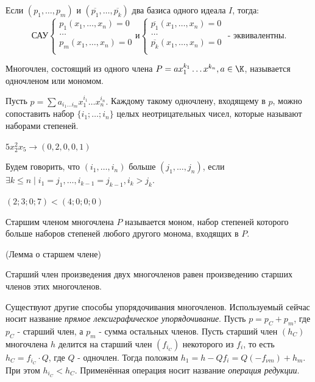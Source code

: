 \utv Если $(p_1,\ldots,p_m)$ и $(\overline{p_1},\ldots,\overline{p_k})$ два базиса одного идеала $I$, тогда:
\begin{equation*}
	\text{САУ}
	\begin{cases}
	   	p_1(x_1,\ldots,x_n) = 0\\
		\ldots\\
	   	p_m(x_1,\ldots,x_n) = 0\\
	\end{cases}
\text{и}
	\begin{cases}
	   	\overline{p_1}(x_1,\ldots,x_n) = 0\\
		\ldots\\
	   	\overline{p_k}(x_1,\ldots,x_n) = 0\\
	\end{cases}
\text{ - эквивалентны.}
\end{equation*}

\opr Многочлен, состоящий из одного члена $P = ax_1^{k_1}\ldots x^{k_n}, a \in \K$, называется одночленом или мономом.

Пусть $p = \sum a_{i_1 \ldots i_m}x_1^{i_1}\ldots x_n^{i_n}.$ Каждому такому одночлену, входящему в $p$, можно сопоставить набор $\{i_1;\ldots;i_n\}$  целых неотрицательных чисел, которые называют наборами степеней.

\example $5x_2^2x_5 \rightarrow (0,2,0,0,1)$

\opr Будем говорить, что $(i_1,\ldots,i_n)$ больше $(j_1,\ldots,j_n)$, если $\exists k \le n \mid i_1 = j_1, \ldots, i_{k-1} = j_{k-1},i_k > j_k$.

\example $(2;3;0;7) < (4;0;0;0)$

\opr Старшим членом многочлена $P$ называется моном, набор степеней которого больше наборов степеней любого другого монома, входящих в $P$.

\lem (Лемма о старшем члене)

Старший член произведения двух многочленов равен произведению старших членов этих многочленов.

\note Существуют другие способы упорядочивания многочленов. Используемый сейчас носит название \textit{прямое лексиграфическое упорядочивание}. Пусть $p = p_C + p_m$, где $p_C$ - старший член, а $p_m$ - сумма остальных членов. Пусть старший член $(h_C)$ многочлена $h$ делится на старший член $(f_{i_C})$ некоторого из $f_i$, то есть $h_C = f_{i_C} \cdot Q$, где $Q$ - одночлен. Тогда положим $h_1 = h - Qf_i = Q(-f_{\nu m}) + h_m$. При этом $h_{i_C} < h_C$. Применённая операция носит название \emph{операция редукции}.

